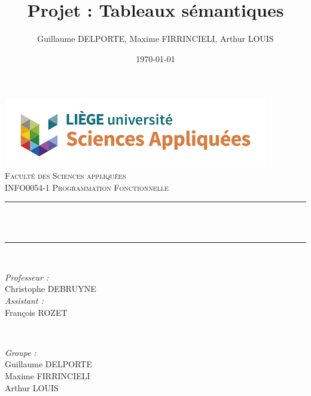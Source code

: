 \documentclass{article}
\begin{document}

 \title{Projet : Tableaux sémantiques}								%
 \author{Guillaume DELPORTE, Maxime FIRRINCIELI, Arthur LOUIS}								%
 \date{\today}											%

 \makeatletter
 \let\thetitle\@title
 \let\theauthor\@author
 \let\thedate\@date
 \makeatother

 \pagestyle{fancy}
 \fancyhf{}
 \rhead{\theauthor}
 \lhead{\thetitle}
 \cfoot{\thepage}

 \begin{titlepage}
 	\centering
     \vspace*{0.5 cm}
     \includegraphics[scale = 0.7]{facsa.png}\\[1.0 cm]	%
     \textsc{\LARGE \newline\newline Faculté des Sciences appliquées}\\[2.0 cm]	%
 	\textsc{\Large INFO0054-1 Programmation Fonctionnelle}\\[0.5 cm]				%
 	\rule{\linewidth}{0.2 mm} \\[0.4 cm]
 	{ \huge \bfseries \thetitle}\\
 	\rule{\linewidth}{0.2 mm} \\[1.5 cm]

 	\begin{minipage}{0.5\textwidth}
 		\begin{flushleft} \large
 			\emph{Professeur :}\\
 			Christophe DEBRUYNE\\
            \vspace{0.5cm}
            \emph{Assistant :}\\
            François ROZET\\
 			\end{flushleft}
 			\end{minipage}~
 			\begin{minipage}{0.4\textwidth}

 			\begin{flushright} \large
 			\emph{Groupe :} \\
 			Guillaume DELPORTE\\
            Maxime FIRRINCIELI\\
            Arthur LOUIS\\
 		\end{flushright}

 	\end{minipage}\\[2 cm]


     \thedate
 \end{titlepage}
\end{document}
